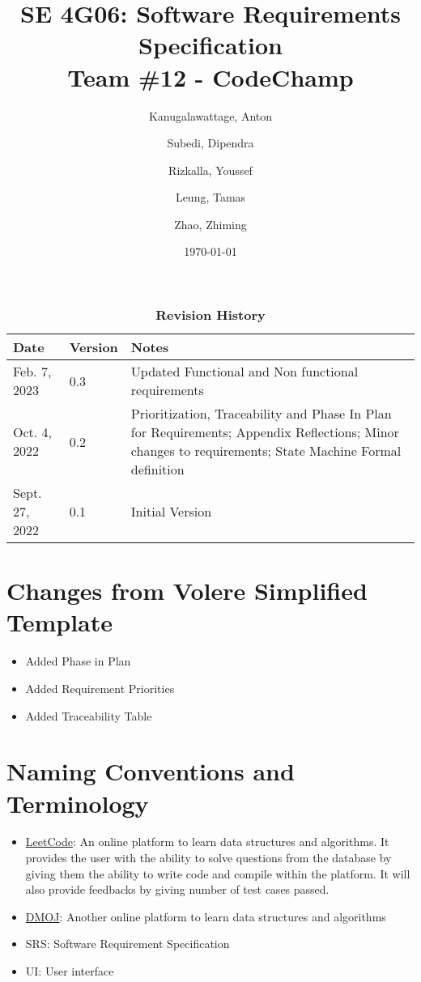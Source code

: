 \documentclass[12pt, titlepage]{article}
\title{SE 4G06: Software Requirements Specification\\Team \#12 - CodeChamp}
\author{
  Kanugalawattage, Anton
  \and
  Subedi, Dipendra
  \and
  Rizkalla, Youssef
  \and
  Leung, Tamas
  \and
  Zhao, Zhiming
}
\date{\today}
\begin{document}
\maketitle


\begin{table}[h]
\caption{\bf Revision History}
\begin{tabularx}{\textwidth}{p{3cm}p{2cm}X}
\toprule {\bf Date} & {\bf Version} & {\bf Notes}\\
\midrule
Feb. 7, 2023& 0.3 & Updated Functional and Non functional requirements\\
Oct. 4, 2022 & 0.2 & Prioritization, Traceability and Phase In Plan for Requirements; Appendix Reflections; Minor changes to requirements; State Machine Formal definition\\
Sept. 27, 2022 & 0.1 & Initial Version\\
\bottomrule
\end{tabularx}
\end{table}

\newpage

\tableofcontents
\listoftables
\listoffigures

\newpage


\section*{Changes from Volere Simplified Template}
\begin{itemize}
    \item Added Phase in Plan
    \item Added Requirement Priorities
    \item Added Traceability Table
\end{itemize}

\section*{Naming Conventions and Terminology}
\begin{itemize}
    \item \href{http://www.leetcode.com}{LeetCode}: An online platform to learn data structures and algorithms. It provides the user with the ability to solve questions from the database by giving them the ability to write code and compile within the platform. It will also provide feedbacks by giving number of test cases passed.
    \item \href{http://www.dmoj.ca}{DMOJ}: Another online platform to learn data structures and algorithms
    \item SRS: Software Requirement Specification
    \item UI: User interface
\end{itemize}
\end{document}

